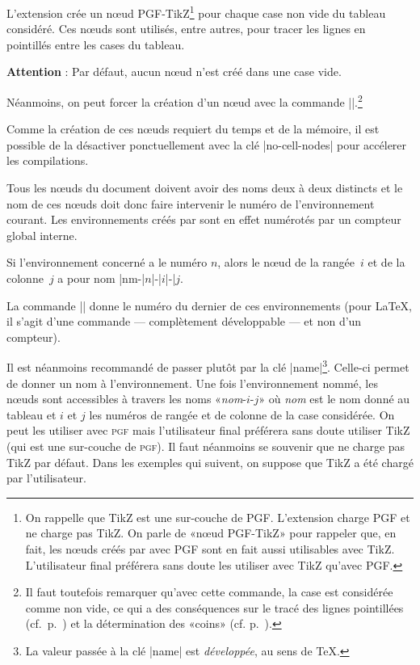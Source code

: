 \documentclass[dvipsnames]{article}%
\begin{document}

L'extension  crée un nœud PGF-TikZ\footnote{On rappelle que TikZ
  est une sur-couche de PGF. L'extension  charge PGF et ne
  charge pas TikZ. On parle de «nœud PGF-TikZ» pour rappeler que, en fait, les
  nœuds créés par  avec PGF sont en fait aussi utilisables avec
  TikZ. L'utilisateur final préférera sans doute les utiliser avec TikZ qu'avec
  PGF.} pour chaque case non vide du tableau considéré. Ces nœuds sont utilisés,
entre autres, pour tracer les lignes en pointillés entre les cases du tableau.

\smallskip
\textbf{Attention} : Par défaut, aucun nœud n'est créé dans une case vide.

\smallskip
Néanmoins, on peut forcer la création d'un nœud avec la commande |\NotEmpty|.\footnote{Il faut toutefois remarquer qu'avec cette commande, la
  case est considérée comme non vide, ce qui a des conséquences sur le tracé des
lignes pointillées (cf.~p.~\pageref{Cdots}) et la détermination des «coins»
(cf. p.~\pageref{corners}).}

\medskip
Comme la création de ces nœuds requiert du temps et de la mémoire, il est
possible de la désactiver ponctuellement avec la clé |no-cell-nodes| pour
accélerer les compilations. 

\medskip
Tous les nœuds du document doivent avoir des noms deux à deux distincts et le
nom de ces nœuds doit donc faire intervenir le numéro de l'environnement
courant. Les environnements créés par  sont en effet numérotés
par un compteur global interne.

\smallskip
Si l'environnement concerné a le numéro $n$, alors le nœud de la rangée~$i$ et
de la colonne~$j$ a pour nom |nm-|$n$|-|$i$|-|$j$.

\smallskip
{}
La commande |\NiceMatrixLastEnv| donne le numéro du dernier de ces
environnements (pour LaTeX, il s'agit d'une commande — complètement développable
— et non d'un compteur).

\smallskip
{}
Il est néanmoins recommandé de passer plutôt par la clé |name|\footnote{La
  valeur passée à la clé |name| est \emph{développée}, au sens de TeX.}.
Celle-ci permet de donner un nom à l'environnement. Une fois l'environnement
nommé, les nœuds sont accessibles à travers les noms «\textsl{nom}-$i$-$j$» où
\textsl{nom} est le nom donné au tableau et $i$ et $j$ les numéros de rangée et
de colonne de la case considérée. On peut les utiliser avec \textsc{pgf} mais
l'utilisateur final préférera sans doute utiliser TikZ (qui est une sur-couche
de \textsc{pgf}). Il faut néanmoins se souvenir que  ne charge
pas TikZ par défaut. Dans les exemples qui suivent, on suppose que TikZ a été
chargé par l'utilisateur.
\end{document}
